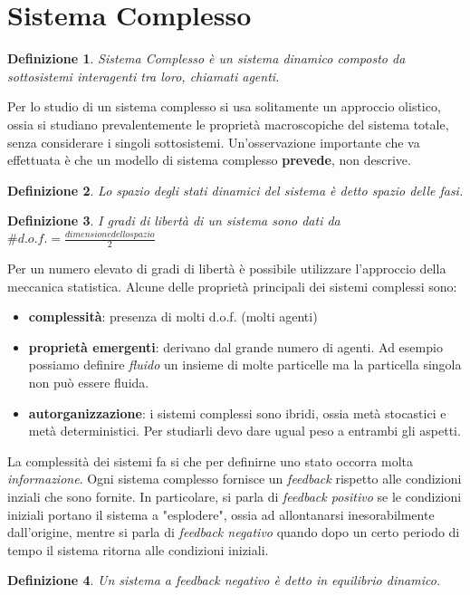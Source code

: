 \documentclass[12pt, a4paper]{book}
\theoremstyle{theorem}
\newtheorem{definition}{Definizione}[section]
\begin{document}
		\section{Sistema Complesso}
			\begin{definition}
				\textit{Sistema Complesso} è un sistema dinamico composto da sottosistemi interagenti tra loro, chiamati agenti.
			\end{definition}
			Per lo studio di un sistema complesso si usa solitamente un approccio olistico, ossia si studiano prevalentemente le proprietà macroscopiche del sistema totale, senza considerare i singoli sottosistemi.
			Un'osservazione importante che va effettuata è che un modello di sistema complesso \textbf{prevede}, non descrive.
			\begin{definition}
				Lo spazio degli stati dinamici del sistema è detto spazio delle fasi.
			\end{definition}
			\begin{definition}
				I gradi di libertà di un sistema sono dati da $\# d.o.f.=\frac{dimensione dello spazio}{2}$
			\end{definition}
			Per un numero elevato di gradi di libertà è possibile utilizzare l'approccio della meccanica statistica.
			Alcune delle proprietà principali dei sistemi complessi sono:
			\begin{itemize}
				\item \textbf{complessità}: presenza di molti d.o.f. (molti agenti)
				\item \textbf{proprietà emergenti}: derivano dal grande numero di agenti. Ad esempio possiamo definire \textit{fluido} un insieme di molte particelle ma la particella singola non può essere fluida.
				\item \textbf{autorganizzazione}: i sistemi complessi sono ibridi, ossia metà stocastici e metà deterministici. Per studiarli devo dare ugual peso a entrambi gli aspetti.
			\end{itemize}
			La complessità dei sistemi fa si che per definirne uno stato occorra molta \emph{informazione}.
			Ogni sistema complesso fornisce un \emph{feedback} rispetto alle condizioni inziali che sono fornite.
			In particolare, si parla di \emph{feedback positivo} se le condizioni iniziali portano il sistema a "esplodere", ossia ad allontanarsi inesorabilmente dall'origine, mentre si parla di \emph{feedback negativo} quando dopo un certo periodo di tempo il sistema ritorna alle condizioni iniziali.
			\begin{definition}
				Un sistema a feedback negativo è detto in equilibrio dinamico.
			\end{definition}
		
\end{document}
